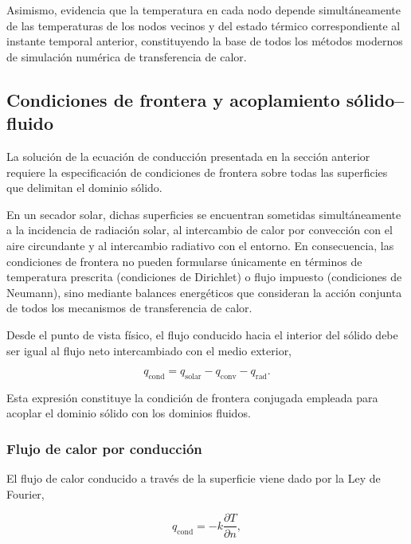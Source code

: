 Asimismo, evidencia que la temperatura en cada nodo depende simultáneamente de las temperaturas de los nodos vecinos y del estado térmico correspondiente al instante temporal anterior, constituyendo la base de todos los métodos modernos de simulación numérica de transferencia de calor.

\subsection{Condiciones de frontera y acoplamiento sólido--fluido}

La solución de la ecuación de conducción presentada en la sección anterior requiere la especificación de condiciones de frontera sobre todas las superficies que delimitan el dominio sólido.

En un secador solar, dichas superficies se encuentran sometidas simultáneamente a la incidencia de radiación solar, al intercambio de calor por convección con el aire circundante y al intercambio radiativo con el entorno. En consecuencia, las condiciones de frontera no pueden formularse únicamente en términos de temperatura prescrita (condiciones de Dirichlet) o flujo impuesto (condiciones de Neumann), sino mediante balances energéticos que consideran la acción conjunta de todos los mecanismos de transferencia de calor.

Desde el punto de vista físico, el flujo conducido hacia el interior del sólido debe ser igual al flujo neto intercambiado con el medio exterior,

\begin{equation}
q_{\mathrm{cond}}
=
q_{\mathrm{solar}}
-
q_{\mathrm{conv}}
-
q_{\mathrm{rad}}.
\label{eq:balance}
\end{equation}

Esta expresión constituye la condición de frontera conjugada empleada para acoplar el dominio sólido con los dominios fluidos.

\subsubsection{Flujo de calor por conducción}

El flujo de calor conducido a través de la superficie viene dado por la Ley de Fourier,

\begin{equation}
q_{\mathrm{cond}}
=
-k
\frac{\partial T}{\partial n},
\label{eq:qcond}
\end{equation}

